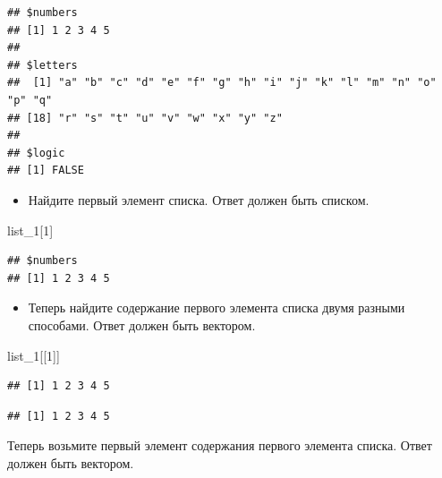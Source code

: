 \documentclass[]{book}
\newenvironment{Shaded}{\begin{snugshade}}{\end{snugshade}}
\newcommand{\DecValTok}[1]{\textcolor[rgb]{0.00,0.00,0.81}{#1}}
\newcommand{\NormalTok}[1]{#1}
\newcommand{\OperatorTok}[1]{\textcolor[rgb]{0.81,0.36,0.00}{\textbf{#1}}}
\providecommand{\tightlist}{%
  \setlength{\itemsep}{0pt}\setlength{\parskip}{0pt}}
\begin{document}
\begin{verbatim}
## $numbers
## [1] 1 2 3 4 5
## 
## $letters
##  [1] "a" "b" "c" "d" "e" "f" "g" "h" "i" "j" "k" "l" "m" "n" "o" "p" "q"
## [18] "r" "s" "t" "u" "v" "w" "x" "y" "z"
## 
## $logic
## [1] FALSE
\end{verbatim}

\begin{itemize}
\tightlist
\item
  Найдите первый элемент списка. Ответ должен быть списком.
\end{itemize}

\begin{Shaded}
\begin{Highlighting}[]
\NormalTok{list_}\DecValTok{1}\NormalTok{[}\DecValTok{1}\NormalTok{]}
\end{Highlighting}
\end{Shaded}

\begin{verbatim}
## $numbers
## [1] 1 2 3 4 5
\end{verbatim}

\begin{itemize}
\tightlist
\item
  Теперь найдите содержание первого элемента списка двумя разными способами. Ответ должен быть вектором.
\end{itemize}

\begin{Shaded}
\begin{Highlighting}[]
\NormalTok{list_}\DecValTok{1}\NormalTok{[[}\DecValTok{1}\NormalTok{]]}
\end{Highlighting}
\end{Shaded}

\begin{verbatim}
## [1] 1 2 3 4 5
\end{verbatim}

\begin{Shaded}
\end{Shaded}

\begin{verbatim}
## [1] 1 2 3 4 5
\end{verbatim}

Теперь возьмите первый элемент содержания первого элемента списка. Ответ должен быть вектором.
\end{document}
